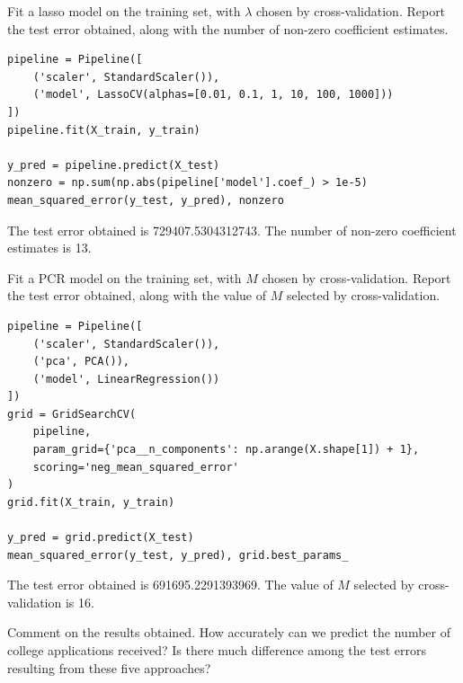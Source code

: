 \documentclass{article}
\begin{document}
\begin{probset}
\begin{prob}
\begin{subprobset}
        \newpage

        \begin{subprob}
            Fit a lasso model on the training set, with $\lambda$ chosen by cross-validation. Report the test error obtained, along with the number of non-zero coefficient estimates.

            \begin{verbatim}
pipeline = Pipeline([
    ('scaler', StandardScaler()),
    ('model', LassoCV(alphas=[0.01, 0.1, 1, 10, 100, 1000]))
])
pipeline.fit(X_train, y_train)

y_pred = pipeline.predict(X_test)
nonzero = np.sum(np.abs(pipeline['model'].coef_) > 1e-5)
mean_squared_error(y_test, y_pred), nonzero
            \end{verbatim}

            \begin{soln}
                The test error obtained is 729407.5304312743. The number of non-zero coefficient estimates is 13.
            \end{soln}
        \end{subprob}

        \begin{subprob}
            Fit a PCR model on the training set, with $M$ chosen by cross-validation. Report the test error obtained, along with the value of $M$ selected by cross-validation.

            \begin{verbatim}
pipeline = Pipeline([
    ('scaler', StandardScaler()),
    ('pca', PCA()),
    ('model', LinearRegression())
])
grid = GridSearchCV(
    pipeline, 
    param_grid={'pca__n_components': np.arange(X.shape[1]) + 1}, 
    scoring='neg_mean_squared_error'
)
grid.fit(X_train, y_train)

y_pred = grid.predict(X_test)
mean_squared_error(y_test, y_pred), grid.best_params_
            \end{verbatim}

            \begin{soln}
                The test error obtained is 691695.2291393969. The value of $M$ selected by cross-validation is 16.
            \end{soln}
        \end{subprob}

        \begin{subprob}[g]
            Comment on the results obtained. How accurately can we predict the number of college applications received? Is there much difference among the test errors resulting from these five approaches?


\end{subprob}
\end{subprobset}
\end{prob}
\end{probset}
\end{document}
